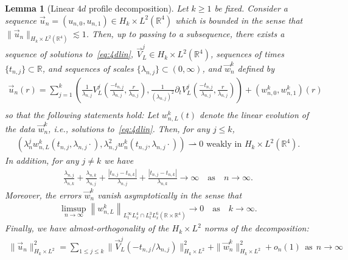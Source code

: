 \documentclass[10pt,reqno]{amsart}
\newcommand{\R}{\mathbb{R}}
\newcommand{\la}{\lambda}
\newcommand{\p}{\partial}
\newcommand{\abs}[1]{\left\lvert{#1}\right\rvert}
\newcommand{\EQ}[1]{\begin{equation}\begin{split} #1 \end{split}\end{equation}}
\numberwithin{equation}{section}
\newtheorem{lem}[thm]{Lemma}
\theoremstyle{remark}
\newcommand{\mas}{{\ \ \text{as} \ \ }}
\newcommand{\0}{\emptyset}
\begin{document}
\begin{lem}[Linear $4d$ profile decomposition] \emph{\cite[Main Theorem]{BG}} \label{l:bg} Let $k \ge1$ be fixed.  Consider a sequence  $\vec u_n = (u_{n, 0}, u_{n, 1}) \in {H}_k \times L^2( \R^4)$ which is bounded in the sense that  $ \|\vec u_n\|_{H_k \times L^2(\R^4)} \lesssim 1$. Then, up to passing to a subsequence,  there exists a sequence of solutions to~\eqref{eq:4dlin}, $\vec V_L^j  \in H_k \times L^2(\R^4)$,  sequences of times $\{t_{n,j}\}\subset \R$, and sequences of scales $\{\la_{n, j}\}\subset (0, \infty)$, and  $\vec w_n^k$ defined by 
\EQ{ \label{eq:4dlinprof}  
\vec u_n(r) = \sum_{j=1}^k (\frac{1}{\la_{n, j}}V_L^j\left( \frac{-t_{n, j}}{ \la_{n, j}}, \frac{r}{ \la_{n, j}}\right),  \frac{1}{(\la_{n, j})^2}\p_t V_L^j\left( \frac{-t_{n, j}}{ \la_{n, j}}, \frac{r}{ \la_{n, j}}\right)) + (w_{n, 0}^k, w_{n, 1}^k)(r)\\
}
so that the following statements hold: Let $w_{n, L}^k(t)$ denote the linear evolution of the data $\vec w_n^k$, i.e., solutions to~\eqref{eq:4dlin}. Then, for any $j \le k$, 
\EQ{ \label{eq:w-weak}
(\la_{n}^j w_{n, L}^k(  t_{n, j},  \la_{n, j}\cdot) , \la_{n, j}^2 w_n^k(  t_{n, j},  \la_{n, j}\cdot)) \rightharpoonup 0\, \,  \textrm{weakly in} \, \,  H_k \times L^2(\R^4). 
}
In addition, for any $j\neq k$ we have
\EQ{ \label{eq:oscales}
\frac{\la_{n, j}}{\la_{n, k}} + \frac{\la_{n, k}}{\la_{n, j}} + \frac{\abs{t_{n, j}-t_{n, k}}}{\la_{n, j}} + \frac{\abs{t_{n, j}-t_{n, k}}}{\la_{n, k}} \to \infty \quad \textrm{as} \quad n \to \infty.
}
Moreover, the errors $\vec w_n^k$ vanish asymptotically in the sense that 
\EQ{ \label{eq:w-in-strich}
\limsup_{n \to \infty} \left\| w_{n, L}^k\right\|_{L^{\infty}_tL^4_x \cap L^3_tL^6_x( \R \times \R^4)}  \to 0 \quad \textrm{as} \quad k \to \infty.
}
Finally, we have almost-orthogonality of the $H_k \times L^2$ norms of the decomposition: 
\EQ{ \label{eq:free-en-ort}
\|\vec u_n\|_{H_k \times L^2}^2 = \sum_{1 \le j \le k} \| \vec V_L^j( - t_{n, j}/ \la_{n, j}) \|_{H_k \times L^2}^2  +  \|\vec w_n^k\|_{H_k\times L^2}^2 + o_n(1) \mas n \to \infty
}

\end{lem}
\end{document}
